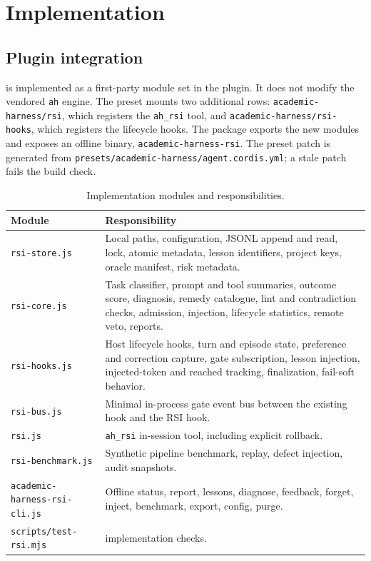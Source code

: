 \section{Implementation}
\label{sec:implementation}

\subsection{Plugin integration}
\label{sec:plugin-integration}
\system{} is implemented as a first-party module set in the \ah{} plugin. It does not modify the vendored \texttt{ah} engine. The preset mounts two additional rows: \texttt{academic-harness/rsi}, which registers the \texttt{ah\_rsi} tool, and \texttt{academic-harness/rsi-hooks}, which registers the lifecycle hooks. The package exports the new modules and exposes an offline binary, \texttt{academic-harness-rsi}. The preset patch is generated from \texttt{presets/academic-harness/agent.cordis.yml}; a stale patch fails the build check.

\begin{table}[t]
\centering
\small
\caption{Implementation modules and responsibilities.}
\label{tab:modules}
\begin{tabularx}{\linewidth}{@{}l>{\raggedright\arraybackslash}X@{}}
\toprule
Module & Responsibility \\
\midrule
\texttt{rsi-store.js} & Local paths, configuration, JSONL append and read, lock, atomic metadata, lesson identifiers, project keys, oracle manifest, risk metadata. \\
\texttt{rsi-core.js} & Task classifier, prompt and tool summaries, outcome score, diagnosis, remedy catalogue, lint and contradiction checks, admission, injection, lifecycle statistics, remote veto, reports. \\
\texttt{rsi-hooks.js} & Host lifecycle hooks, turn and episode state, preference and correction capture, gate subscription, lesson injection, injected-token and reached tracking, finalization, fail-soft behavior. \\
\texttt{rsi-bus.js} & Minimal in-process gate event bus between the existing \ah{} hook and the RSI hook. \\
\texttt{rsi.js} & \texttt{ah\_rsi} in-session tool, including explicit rollback. \\
\texttt{rsi-benchmark.js} & Synthetic pipeline benchmark, replay, defect injection, audit snapshots. \\
\texttt{academic-harness-rsi-cli.js} & Offline status, report, lessons, diagnose, feedback, forget, inject, benchmark, export, config, purge. \\
\texttt{scripts/test-rsi.mjs} & 96 implementation checks. \\
\bottomrule
\end{tabularx}
\end{table}

